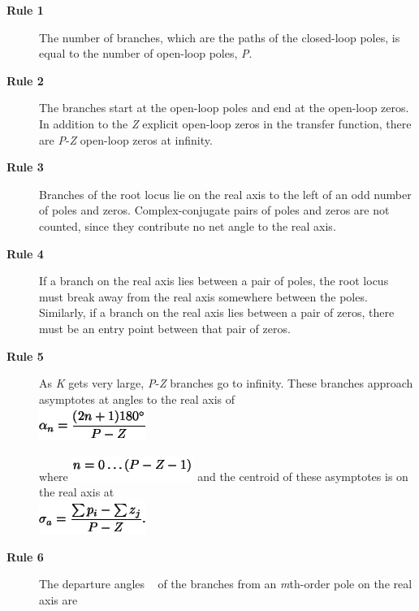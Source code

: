 \documentclass[16pt]{article}
\begin{document}
\begin{description}
	\item[\textbf{Rule 1} ]
	The number of branches, which are the paths of the closed-loop poles, is
	equal to the number of open-loop poles, \emph{P}.
	\item[\textbf{Rule 2} ]
	The branches start at the open-loop poles and end at the open-loop
	zeros. In addition to the \emph{Z} explicit open-loop zeros in the
	transfer function, there are \emph{P}-\emph{Z} open-loop zeros at
	infinity.
	\item[\textbf{Rule 3} ]
	Branches of the root locus lie on the real axis to the left of an odd
	number of poles and zeros. Complex-conjugate pairs of poles and zeros
	are not counted, since they contribute no net angle to the real axis.
	\item[\textbf{Rule 4} ]
	If a branch on the real axis lies between a pair of poles, the root
	locus must break away from the real axis somewhere between the poles.
	Similarly, if a branch on the real axis lies between a pair of zeros,
	there must be an entry point between that pair of zeros.
	\item[\textbf{Rule 5} ]
	As \emph{K} gets very large, \emph{P}-\emph{Z} branches go to infinity.
	These branches approach asymptotes at angles to the real axis of\\
	
	\includegraphics[width=1.36458in,height=0.42708in]{./The Root Locus Rules_files/img1.png}
	
	where
	\includegraphics[width=1.56250in,height=0.32292in]{./The Root Locus Rules_files/img2.png}
	and the centroid of these asymptotes is on the real axis at\\
	
	\includegraphics[width=1.36458in,height=0.42708in]{./The Root Locus Rules_files/img3.png}
	\item[\textbf{Rule 6} ]
	The departure angles \protect\hypertarget{2277}{}{~} of the branches
	from an \emph{m}th-order pole on the real axis are\\
	

\end{description}
\end{document}
